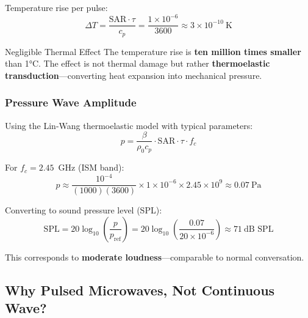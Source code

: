 Temperature rise per pulse:
\begin{equation}
\Delta T = \frac{\text{SAR} \cdot \tau}{c_p} = \frac{1 \times 10^{-6}}{3600} \approx 3 \times 10^{-10}~\text{K}
\label{eq:frey-temp-calc}
\end{equation}

\begin{calloutbox}{Negligible Thermal Effect}
The temperature rise is \textbf{ten million times smaller} than 1°C. The effect is not thermal damage but rather \textbf{thermoelastic transduction}---converting heat expansion into mechanical pressure.
\end{calloutbox}

\subsubsection{Pressure Wave Amplitude}

Using the Lin-Wang thermoelastic model with typical parameters:
\begin{equation}
p = \frac{\beta}{\rho_0 c_p} \cdot \text{SAR} \cdot \tau \cdot f_c
\label{eq:frey-pressure-calc}
\end{equation}

For $f_c = 2.45$~GHz (ISM band):
\begin{equation}
p \approx \frac{10^{-4}}{(1000)(3600)} \times 1 \times 10^{-6} \times 2.45 \times 10^9 \approx 0.07~\text{Pa}
\end{equation}

Converting to sound pressure level (SPL):
\begin{equation}
\text{SPL} = 20\log_{10}\left(\frac{p}{p_{\text{ref}}}\right) = 20\log_{10}\left(\frac{0.07}{20 \times 10^{-6}}\right) \approx 71~\text{dB SPL}
\end{equation}

This corresponds to \textbf{moderate loudness}---comparable to normal conversation.

\subsection{Why Pulsed Microwaves, Not Continuous Wave?}

